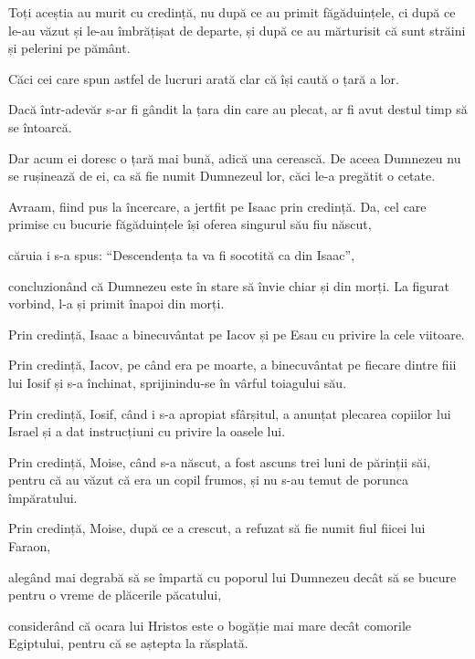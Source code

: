 {\par }{\PP {}Toți aceștia au murit cu credință, nu după ce au primit făgăduințele, ci după ce le-au văzut și le-au îmbrățișat de departe, și după ce au mărturisit că sunt străini și pelerini pe pământ.

Căci cei care spun astfel de lucruri arată clar că își caută o țară a lor.

Dacă într-adevăr s-ar fi gândit la țara din care au plecat, ar fi avut destul timp să se întoarcă.

Dar acum ei doresc o țară mai bună, adică una cerească. De aceea Dumnezeu nu se rușinează de ei, ca să fie numit Dumnezeul lor, căci le-a pregătit o cetate.


\par }{\PP {}Avraam, fiind pus la încercare, a jertfit pe Isaac prin credință. Da, cel care primise cu bucurie făgăduințele își oferea singurul său fiu născut,

căruia i s-a spus: “Descendența ta va fi socotită ca din Isaac”,

concluzionând că Dumnezeu este în stare să învie chiar și din morți. La figurat vorbind, l-a și primit înapoi din morți.


\par }{\PP {}Prin credință, Isaac a binecuvântat pe Iacov și pe Esau cu privire la cele viitoare.


\par }{\PP {}Prin credință, Iacov, pe când era pe moarte, a binecuvântat pe fiecare dintre fiii lui Iosif și s-a închinat, sprijinindu-se în vârful toiagului său.


\par }{\PP {}Prin credință, Iosif, când i s-a apropiat sfârșitul, a anunțat plecarea copiilor lui Israel și a dat instrucțiuni cu privire la oasele lui.


\par }{\PP {}Prin credință, Moise, când s-a născut, a fost ascuns trei luni de părinții săi, pentru că au văzut că era un copil frumos, și nu s-au temut de porunca împăratului.


\par }{\PP {}Prin credință, Moise, după ce a crescut, a refuzat să fie numit fiul fiicei lui Faraon,

alegând mai degrabă să se împartă cu poporul lui Dumnezeu decât să se bucure pentru o vreme de plăcerile păcatului,

considerând că ocara lui Hristos este o bogăție mai mare decât comorile Egiptului, pentru că se aștepta la răsplată.

}
